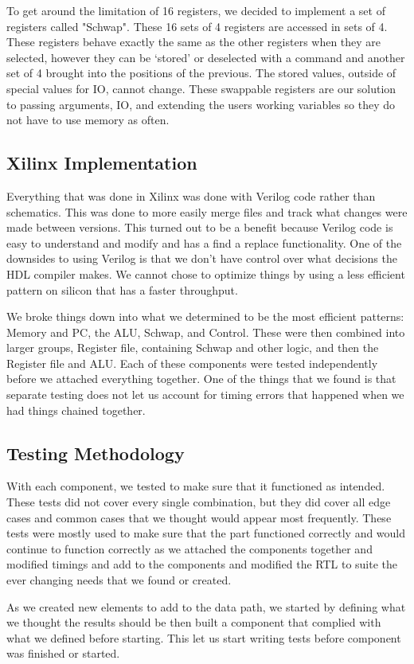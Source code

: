\documentclass{report}
\begin{document}
			To get around the limitation of 16 registers, we decided to implement a set of registers called "Schwap". These 16 sets of 4 registers are accessed in sets of 4. These registers behave exactly the same as the other registers when they are selected, however they can be ‘stored’ or deselected with a command and another set of 4 brought into the positions of the previous. The stored values, outside of special values for IO, cannot change. These swappable registers are our solution to passing arguments, IO, and extending the users working variables so they do not have to use memory as often.
		\subsection{Xilinx Implementation}
			Everything that was done in Xilinx was done with Verilog code rather than schematics. This was done to more easily merge files and track what changes were made between versions. This turned out to be a benefit because Verilog code is easy to understand and modify and has a find a replace functionality.  One of the downsides to using Verilog is that we don't have control over what decisions the HDL compiler makes. We cannot chose to optimize things by using a less efficient pattern on silicon that has a faster throughput.\par
			We broke things down into what we determined to be the most efficient patterns: Memory and PC, the ALU, Schwap, and Control. These were then combined into larger groups, Register file, containing Schwap and other logic, and then the Register file and ALU. Each of these components were tested independently before we attached everything together. One of the things that we found is that separate testing does not let us account for timing errors that happened when we had things chained together.
		\subsection{Testing Methodology}
			With each component, we tested to make sure that it functioned as intended. These tests did not cover every single combination, but they did cover all edge cases and common cases that we thought would appear most frequently. These tests were mostly used to make sure that the part functioned correctly and would continue to function correctly as we attached the components together and modified timings and add to the components and modified the RTL to suite the ever changing needs that we found or created.\par
			As we created new elements to add to the data path, we started by defining what we thought the results should be then built a component that complied with what we defined before starting. This let us start writing tests before component was finished or started.
\end{document}
